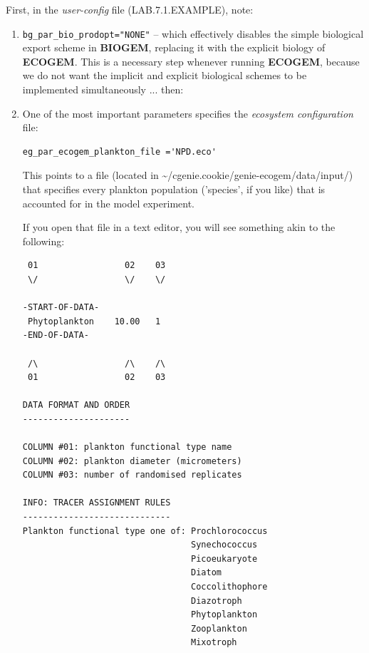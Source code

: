 First, in the \textit{user-config} file (\textsf{\footnotesize LAB.7.1.EXAMPLE}), note:

\begin{enumerate}[noitemsep]

\vspace{1mm}
\item \texttt{bg\_par\_bio\_prodopt="NONE"} -- which effectively disables the simple biological export scheme in \textbf{BIOGEM}, replacing it with the explicit biology of \textbf{ECOGEM}. This is a necessary step whenever running \textbf{ECOGEM}, because we do not want the implicit and explicit biological schemes to be implemented simultaneously ... then:

\vspace{1mm}
\item One of the most important parameters specifies the \textit{ecosystem configuration} file:
\vspace{0mm}
\small\begin{verbatim}
eg_par_ecogem_plankton_file ='NPD.eco'
\end{verbatim}\normalsize
\vspace{-0mm}
This points to a file (located in \textsf{\footnotesize \textasciitilde{}/cgenie.cookie/genie-ecogem/data/input/}) that specifies every plankton population ('species', if you like) that is accounted for in the model experiment. 

\vspace{1mm}
If you open that file in a text editor, you will see something akin to the following:
\scriptsize\begin{verbatim}
 01                 02    03
 \/                 \/    \/

-START-OF-DATA-
 Phytoplankton    10.00   1
-END-OF-DATA-

 /\                 /\    /\
 01                 02    03

DATA FORMAT AND ORDER
---------------------

COLUMN #01: plankton functional type name
COLUMN #02: plankton diameter (micrometers)
COLUMN #03: number of randomised replicates

INFO: TRACER ASSIGNMENT RULES
-----------------------------
Plankton functional type one of: Prochlorococcus
                                 Synechococcus
                                 Picoeukaryote
                                 Diatom
                                 Coccolithophore
                                 Diazotroph
                                 Phytoplankton
                                 Zooplankton
                                 Mixotroph
\end{verbatim}\normalsize


\end{enumerate}
